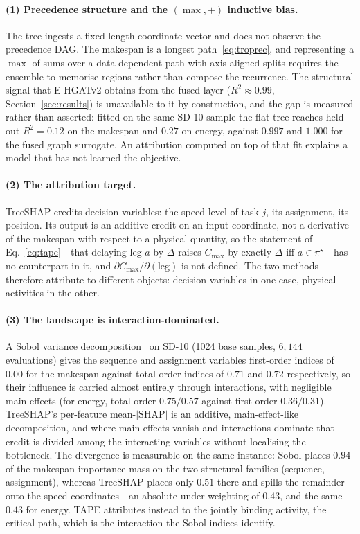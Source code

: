 \documentclass[11pt]{article}
\newcommand{\Cmax}{C_{\max}}
\begin{document}
\paragraph{(1) Precedence structure and the $(\max,+)$ inductive bias.} The tree ingests a
fixed-length coordinate vector and does not observe the precedence DAG. The makespan is a
longest path~\eqref{eq:troprec}, and representing a $\max$ of sums over a data-dependent
path with axis-aligned splits requires the ensemble to memorise regions rather than
compose the recurrence. The structural signal that E-HGATv2 obtains from the fused layer
($R^2\!\approx\!0.99$, Section~\ref{sec:results}) is unavailable to it by construction, and
the gap is measured rather than asserted: fitted on the same \textsf{SD-10} sample the flat
tree reaches held-out $R^2 = 0.12$ on the makespan and $0.27$ on energy, against $0.997$ and
$1.000$ for the fused graph surrogate. An attribution computed on top of that fit explains a
model that has not learned the objective.

\paragraph{(2) The attribution target.} TreeSHAP credits decision variables: the speed
level of task $j$, its assignment, its position. Its output is an additive credit on an
input coordinate, not a derivative of the makespan with respect to a physical quantity,
so the statement of Eq.~\ref{eq:tape}---that delaying leg $a$ by $\Delta$ raises $\Cmax$
by exactly $\Delta$ iff $a\in\pi^\star$---has no counterpart in it, and
$\partial\Cmax/\partial(\text{leg})$ is not defined. The two methods therefore attribute
to different objects: decision variables in one case, physical activities in the other.

\paragraph{(3) The landscape is interaction-dominated.} A Sobol variance
decomposition~\cite{sobol2001} on \textsf{SD-10} (1024 base samples, $6{,}144$
evaluations) gives the sequence and assignment variables first-order indices of $0.00$ for
the makespan against total-order indices of $0.71$ and $0.72$ respectively, so their
influence is carried almost entirely through interactions, with negligible main effects
(for energy, total-order $0.75/0.57$ against first-order $0.36/0.31$). TreeSHAP's
per-feature mean-$|\text{SHAP}|$ is an additive, main-effect-like decomposition, and where
main effects vanish and interactions dominate that credit is divided among the interacting
variables without localising the bottleneck. The divergence is measurable on the same
instance: Sobol places $0.94$ of the makespan importance mass on the two structural
families (sequence, assignment), whereas TreeSHAP places only $0.51$ there and spills the
remainder onto the speed coordinates---an absolute under-weighting of $0.43$, and the same
$0.43$ for energy. TAPE attributes instead to the jointly binding activity, the critical
path, which is the interaction the Sobol indices identify.
\end{document}
